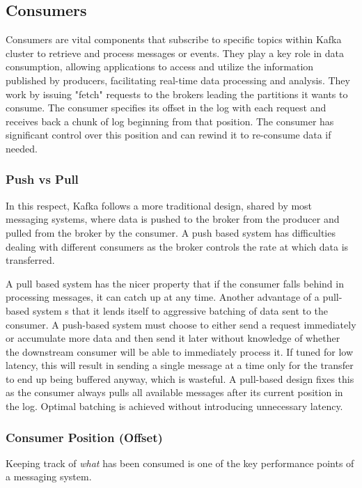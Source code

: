\subsection{Consumers}

Consumers are vital components that subscribe to specific topics within Kafka
cluster to retrieve and process messages or events. They play a key role in
data consumption, allowing applications to access and utilize the information
published by producers, facilitating real-time data processing and analysis.
They work by issuing "fetch" requests to the brokers leading the partitions it
wants to consume.
The consumer specifies its offset in the log with each request and receives
back a chunk of log beginning from that position.
The consumer has significant control over this position and can rewind it to
re-consume data if needed.

\subsubsection{Push vs Pull}

In this respect, Kafka follows a more traditional design, shared by most
messaging systems, where data is pushed to the broker from the producer and
pulled from the broker by the consumer.
A push based system has difficulties dealing with different consumers as the
broker controls the rate at which data is transferred.

A pull based system has the nicer property that if the consumer falls behind 
in processing messages, it can catch up at any time.
Another advantage of a pull-based system s that it lends itself to aggressive
batching of data sent to the consumer. A push-based system must choose to
either send a request immediately or accumulate more data and then send it
later without knowledge of whether the downstream consumer will be able to
immediately process it. If tuned for low latency, this will result in sending
a single message at a time only for the transfer to end up being buffered
anyway, which is wasteful.
A pull-based design fixes this as the consumer always pulls all available
messages after its current position in the log. Optimal batching is achieved
without introducing unnecessary latency.

\subsubsection{Consumer Position (Offset)}

Keeping track of \textit{what} has been consumed is one of the key performance
points of a messaging system.

